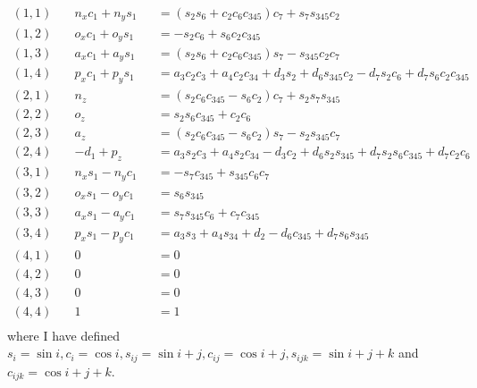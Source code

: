 \documentclass[onecolumn,10pt]{jhwhw}
\begin{document}
\begin{align*}
(1,1) \hspace{1em} & n_{x} c_1 + n_{y} s_1 &&= \left(s_{2} s_{6} + c_{2} c_{6} c_{345}\right) c_{7} + s_{7} s_{345} c_{2} \\
(1,2) \hspace{1em} & o_{x} c_1 + o_{y} s_1 &&= - s_{2} c_{6} + s_{6} c_{2} c_{345} \\
(1,3) \hspace{1em} & a_{x} c_1 + a_{y} s_1 &&= \left(s_{2} s_{6} + c_{2} c_{6} c_{345}\right) s_{7} - s_{345} c_{2} c_{7} \\
(1,4) \hspace{1em} & p_{x} c_1 + p_{y} s_1 &&= a_{3} c_{2} c_{3} + a_{4} c_{2} c_{34} + d_{3} s_{2} + d_{6} s_{345} c_{2} - d_{7} s_{2} c_{6} + d_{7} s_{6} c_{2} c_{345}\\
(2,1) \hspace{1em} & n_{z}                 &&= \left(s_{2} c_{6} c_{345} - s_{6} c_{2}\right) c_{7} + s_{2} s_{7} s_{345} \\
(2,2) \hspace{1em} & o_{z}                 &&= s_{2} s_{6} c_{345} + c_{2} c_{6} \\
(2,3) \hspace{1em} & a_{z}                 &&= \left(s_{2} c_{6} c_{345} - s_{6} c_{2}\right) s_{7} - s_{2} s_{345} c_{7} \\
(2,4) \hspace{1em} & - d_{1} + p_{z}       &&= a_{3} s_{2} c_{3} + a_{4} s_{2} c_{34} - d_{3} c_{2} + d_{6} s_{2} s_{345} + d_{7} s_{2} s_{6} c_{345} + d_{7} c_{2} c_{6}\\
(3,1) \hspace{1em} & n_{x} s_1 - n_{y} c_1 &&= - s_{7} c_{345} + s_{345} c_{6} c_{7} \\
(3,2) \hspace{1em} & o_{x} s_1 - o_{y} c_1 &&= s_{6} s_{345} \\
(3,3) \hspace{1em} & a_{x} s_1 - a_{y} c_1 &&= s_{7} s_{345} c_{6} + c_{7} c_{345} \\
(3,4) \hspace{1em} & p_{x} s_1 - p_{y} c_1 &&= a_{3} s_{3} + a_{4} s_{34} + d_{2} - d_{6} c_{345} + d_{7} s_{6} s_{345}\\
(4,1) \hspace{1em} & 0                     &&= 0 \\
(4,2) \hspace{1em} & 0                     &&= 0 \\
(4,3) \hspace{1em} & 0                     &&= 0 \\
(4,4) \hspace{1em} & 1                     &&= 1\\
\end{align*}
where I have defined $s_i = \sin{i}, c_i = \cos{i}, s_{ij} = \sin{i+j}, c_{ij} = \cos{i+j}, s_{ijk} = \sin{i+j+k}$ and $c_{ijk} = \cos{i+j+k}$.
\end{document}
